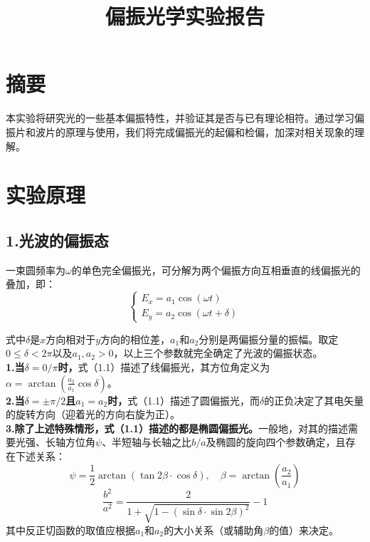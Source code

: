 \documentclass{ctexart}
\title{偏振光学实验报告}
\begin{document}
\maketitle

\section*{摘要}
本实验将研究光的一些基本偏振特性，并验证其是否与已有理论相符。通过学习偏振片和波片的原理与使用，我们将完成偏振光的起偏和检偏，加深对相关现象的理解。


\section{实验原理}

\subsection*{1.\quad 光波的偏振态}

一束圆频率为$\omega$的单色完全偏振光，可分解为两个偏振方向互相垂直的线偏振光的叠加，即：
\begin{equation}
\begin{cases}
  E_x =a_1\cos(\omega t)\\
  E_y =a_2\cos(\omega t+\delta)
\end{cases}
\end{equation}

式中$\delta$是$x$方向相对于$y$方向的相位差，$a_1$和$a_2$分别是两偏振分量的振幅。取定$0\leqslant\delta<2\pi$以及$a_1,a_2>0$，以上三个参数就完全确定了光波的偏振状态。\\
\noindent \textbf{1.当$\delta=0/\pi$时，}式（1.1）描述了线偏振光，其方位角定义为$\alpha=\arctan(\frac{a_2}{a_1}\cos{\delta})$。\\
\noindent \textbf{2.当$\delta=\pm\pi/2$且$a_1=a_2$时，}式（1.1）描述了圆偏振光，而$\delta$的正负决定了其电矢量的旋转方向（迎着光的方向右旋为正）。\\
\noindent \textbf{3.除了上述特殊情形，式（1.1）描述的都是椭圆偏振光。}一般地，对其的描述需要光强、长轴方位角$\psi$、半短轴与长轴之比$b/a$及椭圆的旋向四个参数确定，且存在下述关系：
\begin{equation}
  \psi=\frac{1}{2}\arctan\left(\tan{2\beta}\cdot\cos{\delta}\right),\quad \beta=\arctan\left(\frac{a_2}{a_1}\right)
\end{equation}
\begin{equation}
  \frac{b^2}{a^2}=\frac{2}{1+\sqrt{1-(\sin{\delta}\cdot\sin{2\beta})^2}}-1
\end{equation}
其中反正切函数的取值应根据$a_1$和$a_2$的大小关系（或辅助角$\beta$的值）来决定。
\end{document}
